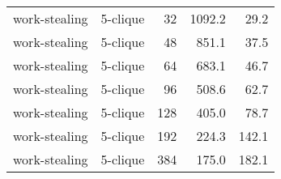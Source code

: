 \begin{longtable}{llr|rr}
         work-stealing &  5-clique &           32 &   1092.2 &     29.2 \\
         work-stealing &  5-clique &           48 &    851.1 &     37.5 \\
         work-stealing &  5-clique &           64 &    683.1 &     46.7 \\
         work-stealing &  5-clique &           96 &    508.6 &     62.7 \\
         work-stealing &  5-clique &          128 &    405.0 &     78.7 \\
         work-stealing &  5-clique &          192 &    224.3 &    142.1 \\
         work-stealing &  5-clique &          384 &    175.0 &    182.1 \\
\end{longtable}
